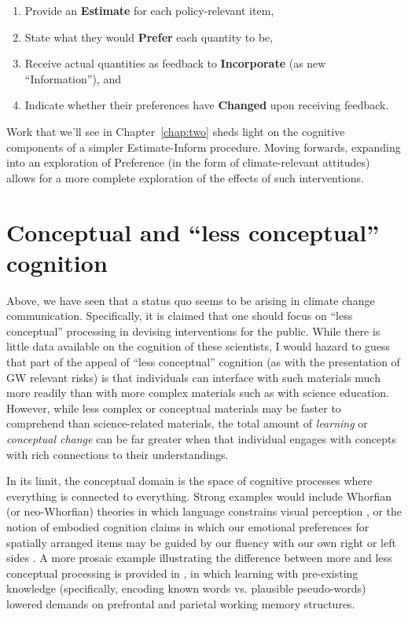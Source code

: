 \begin{enumerate}
\item Provide an \textbf{Estimate} for each policy-relevant item,
\item State what they would \textbf{Prefer} each quantity to be, 
\item Receive actual quantities as feedback to \textbf{Incorporate} (as new
``Information''), and 
\item Indicate whether their preferences have \textbf{Changed} upon receiving feedback.
\end{enumerate}

Work that we'll see in Chapter~\ref{chap:two} sheds light on the cognitive
components of a simpler Estimate-Inform procedure. Moving forwards, expanding
into an exploration of Preference (in the form of climate-relevant attitudes)
allows for a more complete exploration of the effects of such interventions.

\section{Conceptual and \texorpdfstring{``less conceptual''}{``less conceptual''} cognition}
\label{sec:two}

Above, we have seen that a status quo seems to be arising in climate change
communication. Specifically, it is claimed that one should focus on ``less
conceptual'' processing in devising interventions for the public. While there is
little data available on the cognition of these scientists, I would hazard to
guess that part of the appeal of ``less conceptual'' cognition (as with the
presentation of GW relevant risks) is that individuals can interface with such
materials much more readily than with more complex materials such as
with science education. However, while less complex or conceptual materials
may be faster to comprehend than science-related materials, the total amount of 
\emph{learning} or \emph{conceptual change} can be far greater when that
individual engages with concepts with rich connections to their understandings.

In its limit, the conceptual domain is the space of cognitive processes where
everything is connected to everything. Strong examples would include Whorfian
(or neo-Whorfian) theories in which language constrains visual perception
\parencite{boroditsky_does_2001}, or the notion of embodied cognition claims in
which our emotional preferences for spatially arranged items may be guided by
our fluency with our own right or left sides
\parencite{casasanto_embodiment_2009}. A more prosaic example illustrating the
difference between more and less conceptual processing is provided in
\textcite{clark_assembling_2003}, in which learning with pre-existing knowledge
(specifically, encoding known words vs. plausible pseudo-words) lowered demands
on prefrontal and parietal working memory structures.

